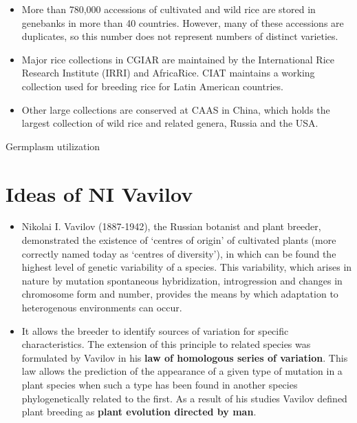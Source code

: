 \documentclass[11pt,ignorenonframetext,aspectratio=169]{beamer}
\providecommand{\tightlist}{%
  \setlength{\itemsep}{0pt}\setlength{\parskip}{0pt}}
\begin{document}
\begin{frame}{}
\protect\hypertarget{section-12}{}
\begin{itemize}
\tightlist
\item
  More than 780,000 accessions of cultivated and wild rice are stored in
  genebanks in more than 40 countries. However, many of these accessions
  are duplicates, so this number does not represent numbers of distinct
  varieties.
\item
  Major rice collections in CGIAR are maintained by the International
  Rice Research Institute (IRRI) and AfricaRice. CIAT maintains a
  working collection used for breeding rice for Latin American
  countries.
\item
  Other large collections are conserved at CAAS in China, which holds
  the largest collection of wild rice and related genera, Russia and the
  USA.
\end{itemize}
\end{frame}

\begin{frame}{Germplasm utilization}
\protect\hypertarget{germplasm-utilization}{}
\end{frame}

\hypertarget{ideas-of-ni-vavilov}{%
\section{Ideas of NI Vavilov}\label{ideas-of-ni-vavilov}}

\begin{frame}{}
\protect\hypertarget{section-13}{}
\begin{itemize}
\item
  Nikolai I. Vavilov (1887-1942), the Russian botanist and plant
  breeder, demonstrated the existence of `centres of origin' of
  cultivated plants (more correctly named today as `centres of
  diversity'), in which can be found the
  \alert{highest level of genetic variability} of a species. This
  variability, which arises in nature by mutation spontaneous
  hybridization, introgression and changes in chromosome form and
  number, provides the means by which adaptation to heterogenous
  environments can occur.
\item
  It allows the breeder to identify sources of variation for specific
  characteristics. The extension of this principle to related species
  was formulated by Vavilov in his \textbf{law of homologous series of
  variation}. This law allows the
  \alert{prediction of the appearance of a given type of mutation in a plant species when such a type has been found in another species phylogenetically related to the first}.
  As a result of his studies Vavilov defined plant breeding as
  \textbf{plant evolution directed by man}.
\end{itemize}
\end{frame}
\end{document}
